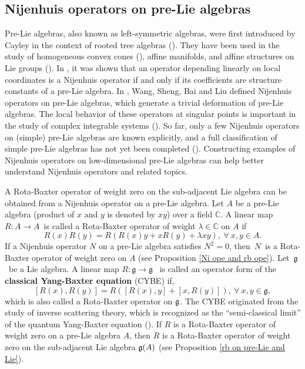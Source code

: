 \documentclass[12pt, reqno]{amsart}
\theoremstyle{plain}
\def \g  {\mathfrak{g}}   %
\begin{document}
\subsection{Nijenhuis operators on pre-Lie algebras}

Pre-Lie algebras, also known as left-symmetric algebras, were first introduced by Cayley in the context of rooted tree algebras (\cite{Cayley}). They have been used in the study of homogeneous convex cones (\cite{Vinberg}), affine manifolds, and affine structures on Lie groups (\cite{Koszul,Medina}). In \cite{Winterhalder}, it was shown that an operator depending linearly on local coordinates is a Nijenhuis operator if and only if its coefficients are structure constants of a pre-Lie algebra. In \cite{Wang}, Wang, Sheng, Bai and Liu defined Nijenhuis operators on pre-Lie algebras, which generate a trivial deformation of pre-Lie algebras. The local behavior of these operators at singular points is important in the study of complex integrable systems (\cite{Bolsinov}). So far, only a few Nijenhuis operators on (simple) pre-Lie algebras are known explicitly, and a full classification of simple pre-Lie algebras has not yet been completed (\cite{Bai-1,Burde,Kim,Kong}). Constructing examples of Nijenhuis operators on low-dimensional pre-Lie algebras can help better understand Nijenhuis operators and related topics.

A Rota-Baxter operator of weight zero on the sub-adjacent Lie algebra can be obtained from a Nijenhuis operator on a pre-Lie algebra.  Let $A$ be a pre-Lie algebra (product of
$x$ and $y$ is denoted by $xy$)  over a field $\mathbb{C}$.
A linear map  $R: A \rightarrow A$~is called a Rota-Baxter operator of weight $\lambda\in  \mathbb{C}$ on $A$ if
\begin{equation}
R(x)R(y)  = R(R(x)y + xR(y)+ \lambda xy),~\forall~ x, y \in A.
\end{equation}
If a Nijenhuis operator $ N $ on a pre-Lie algebra satisfies $ N^2 = 0 $, 
then~$N$~is a Rota-Baxter operator of weight zero on  $A$ (see Proposition \ref{Ni ope and rb ope}).
Let~$\g$~be a Lie algebra. A linear map  $R:\g \rightarrow \g$~
is called an operator form of the {\bf classical Yang-Baxter equation} (CYBE) if,
\begin{equation}\label{eq:RB ope}
[R(x), R(y)] = R([R(x), y] + [x, R(y)]),~\forall~ x, y \in \mathfrak{g},
\end{equation}
which is also called a Rota-Baxter operator on ${\frak g}$. The CYBE originated from the
study of inverse scattering theory, which is recognized as the
``semi-classical
limit'' of the quantum Yang-Baxter equation (\cite{Belavin,Faddeev1,Faddeev2}). If $R$ is a Rota-Baxter operator of weight zero on a pre-Lie algebra $A$, then $R$ is
a Rota-Baxter operator of weight zero on the sub-adjacent Lie algebra ${\frak g}(A)$ (see Proposition \ref{rb on pre-Lie and Lie}).  
\end{document}
